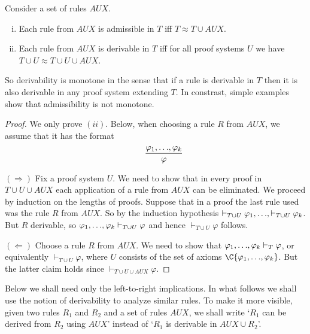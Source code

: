 \documentclass[manuscript, screen, review]{acmart}
\newcommand{\AUX}{\mathit{AUX}}
\begin{document}
\begin{lemma} \label{lem:AUX}
  Consider a set of rules $\AUX$.
  \begin{enumerate}[(i)]
  \item 
  Each rule from $\AUX$ is admissible in $T$ iff $T \approx T \cup \AUX$. 

\item Each rule from $\AUX$ is derivable in $T$ iff for all proof
  systems $U$ we have $T \cup U \approx T \cup U \cup \AUX$.

\end{enumerate}
\end{lemma}

So derivability is monotone in the sense that if a rule is derivable
in $T$ then it is also derivable in any proof system extending $T$. In
constrast, simple examples show that admissibility is not monotone.

\begin{proof}
  We only prove $(ii)$.
Below, when choosing a rule $R$ from $\AUX$, we assume that it has the format
\[ 
 \qquad \frac{\varphi_1,\mbox{$\ldots$},\varphi_k}{\varphi}
\]

\III

\NI
$(\Rightarrow)$ Fix a proof system $U$.  We need to show that in every
proof in $T \cup U \cup \AUX$ each application of a rule from $\AUX$
can be eliminated.  We proceed by induction on the lengths of
proofs. Suppose that in a proof the last rule used was the rule $R$ from $\AUX$.
So by the induction hypothesis
$ \vdash_{T \cup U} \varphi_1, \mbox{$\ldots$}, \vdash_{T \cup U} \varphi_k$.  But $R$
derivable, so 
$\varphi_1, \mbox{$\ldots$}, \varphi_k \vdash_{T \cup U} \varphi$ and hence
$\vdash_{T \cup U} \varphi$ follows.

\III

\NI
$(\Leftarrow)$ Choose a rule $R$ from $\AUX$.
We need to show that
$\varphi_1, \mbox{$\ldots$}, \varphi_k \vdash_T \varphi$, or equivalently
$\vdash_{T \cup U} \varphi$, where $U$ consists of the set of axioms
$\C{\varphi_1,\LL,\varphi_k}$.  But the latter claim holds since
$\vdash_{T \cup U \cup \AUX} \varphi$.
\HB
\end{proof}

Below we shall need only the left-to-right implications.  In what
follows we shall use the notion of derivability to analyze similar
rules. To make it more visible, given two rules $R_1$ and $R_2$ and a
set of rules $\AUX$, we shall write `$R_1$ can be derived from $R_2$
using $\AUX$' instead of `$R_1$ is derivable in $\AUX \cup R_2$'.
\end{document}
